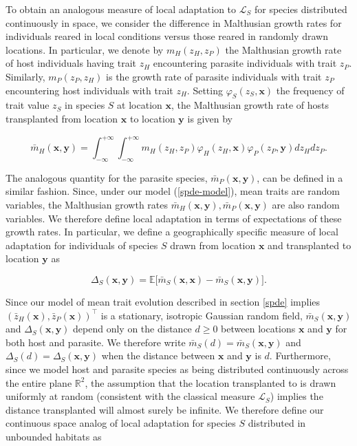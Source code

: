 \documentclass{article}
\begin{document}
To obtain an analogous measure of local adaptation to \(\mathcal L_S\)
for species distributed continuously in space, we consider the
difference in Malthusian growth rates for individuals reared in local
conditions versus those reared in randomly drawn locations. In
particular, we denote by \(m_H(z_H,z_P)\) the Malthusian growth rate of
host individuals having trait \(z_H\) encountering parasite individuals
with trait \(z_P\). Similarly, \(m_P(z_P,z_H)\) is the growth rate of
parasite individuals with trait \(z_P\) encountering host individuals
with trait \(z_H\). Setting \(\varphi_S(z_S,\pmb x)\) the frequency of
trait value \(z_S\) in species \(S\) at location \(\pmb x\), the
Malthusian growth rate of hosts transplanted from location \(\pmb x\) to
location \(\pmb y\) is given by

\begin{equation}
  \bar m_H(\pmb x,\pmb y)=\int_{-\infty}^{+\infty}\int_{-\infty}^{+\infty}m_H(z_H,z_P)\varphi_H(z_H,\pmb x)\varphi_P(z_P,\pmb y)dz_Hdz_P.
\end{equation}

The analogous quantity for the parasite species,
\(\bar m_P(\pmb x,\pmb y)\), can be defined in a similar fashion. Since,
under our model (\ref{spde-model}), mean traits are random variables,
the Malthusian growth rates
\(\bar m_H(\pmb x,\pmb y),\bar m_P(\pmb x,\pmb y)\) are also random
variables. We therefore define local adaptation in terms of expectations
of these growth rates. In particular, we define a geographically
specific measure of local adaptation for individuals of species \(S\)
drawn from location \(\pmb x\) and transplanted to location \(\pmb y\)
as

\begin{equation}
  \Delta_S(\pmb x,\pmb y)=\mathbb E\big[\bar m_S(\pmb x,\pmb x)-\bar m_S(\pmb x,\pmb y)\big].
\end{equation}

Since our model of mean trait evolution described in section \ref{spde}
implies \((\bar z_H(\pmb x),\bar z_P(\pmb x))^\top\) is a stationary,
isotropic Gaussian random field, \(\bar m_S(\pmb x,\pmb y)\) and
\(\Delta_S(\pmb x,\pmb y)\) depend only on the distance \(d\geq0\)
between locations \(\pmb x\) and \(\pmb y\) for both host and parasite.
We therefore write \(\bar m_S(d)=\bar m_S(\pmb x,\pmb y)\) and
\(\Delta_S(d)=\Delta_S(\pmb x,\pmb y)\) when the distance between
\(\pmb x\) and \(\pmb y\) is \(d\). Furthermore, since we model host and
parasite species as being distributed continuously across the entire
plane \(\mathbb R^2\), the assumption that the location transplanted to
is drawn uniformly at random (consistent with the classical measure
\(\mathcal L_S\)) implies the distance transplanted will almost surely
be infinite. We therefore define our continuous space analog of local
adaptation for species \(S\) distributed in unbounded habitats as
\end{document}
